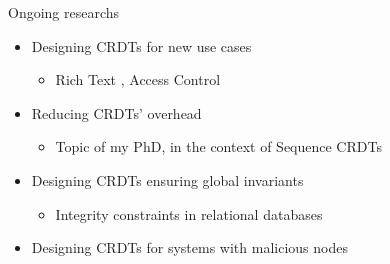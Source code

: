 \begin{frame}{Ongoing researchs}
    \begin{itemize}
        \item Designing CRDTs for new use cases
        \begin{itemize}
            \item Rich Text \cite{2022-peritext-litt}, Access Control \cite{2023-access-control-crdts-rault}
        \end{itemize}
        \pause
        \item Reducing CRDTs' overhead
        \begin{itemize}
            \item Topic of my PhD, in the context of Sequence CRDTs \cite{2022-rls-tpds-nicolas}
        \end{itemize}
        \pause
        \item Designing CRDTs ensuring global invariants
        \begin{itemize}
            \item Integrity constraints in relational databases \cite{2023-synql-elvinger,electrisql}
        \end{itemize}
        \pause
        \item Designing CRDTs for systems with malicious nodes
    \end{itemize}
\end{frame}